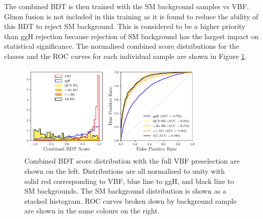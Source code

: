 The combined BDT is then trained with the SM background samples vs VBF. Gluon fusion is not included in this training as it is found to reduce the ability of this BDT to reject SM background. This is considered to be a higher priority than ggH rejection because rejection of SM background has the largest impact on statistical significance.
The normalised combined score distributions for the classes and the ROC curves for each individual sample are shown in Figure \ref{fig:event_categorisaton:combined_bdt_performance}.
\begin{figure}[h!]
    \centering
        \includegraphics[width=0.8\textwidth]{figures/event_selection/combined_BDT_PS.pdf}
    \caption{Combined BDT score distribution with the full VBF preselection are shown on the left. Distributions are all normalised to unity with solid red corresponding to VBF, blue line to ggH, and black line to SM backgrounds. The SM background distribution is shown as a stacked histogram. ROC curves broken down by background sample are shown in the same colours on the right.}
    \label{fig:event_categorisaton:combined_bdt_performance}
\end{figure}



